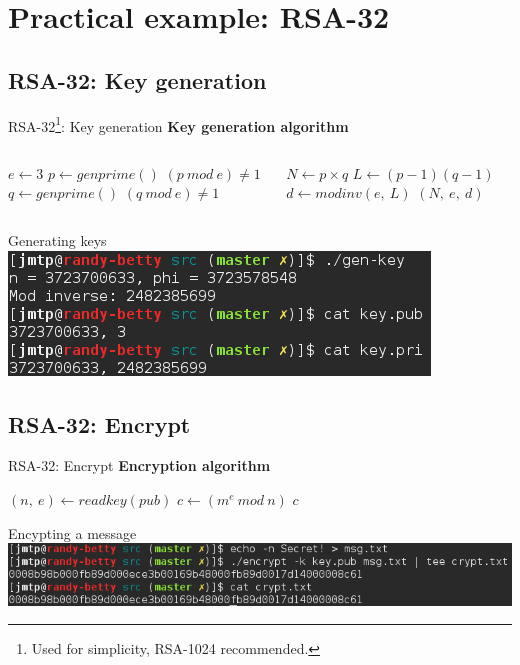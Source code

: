 \documentclass[pdf]{beamer}
\begin{document}
\section{Practical example: RSA-32}
\subsection{RSA-32: Key generation}
\begin{frame}{RSA-32\footnote{Used for simplicity, RSA-1024 recommended.}: Key generation}
	\textbf{Key generation algorithm}
	\begin{footnotesize}
	\begin{columns}[t]
	\begin{algorithmic}
		\State $e\gets 3$
		\Repeat
			\State $p\gets genprime()$
		\Until $(p\ mod\ e) \neq 1$
		\Repeat
			\State $q\gets genprime()$
		\Until $(q\ mod\ e) \neq 1$
	\end{algorithmic}
	\column{0.5\linewidth}
	\begin{algorithmic}
		\State $N\gets p\times q$
		\State $L\gets (p-1)(q-1)$
		\State $d\gets modinv(e,\ L)$
		\State \Return $(N,\ e,\ d)$
	\end{algorithmic}
	\end{columns}
	\end{footnotesize}
	\vspace{0.2cm}
	\begin{block}{Generating keys}
		\centering
		\includegraphics[scale=0.4]{img/gen-key.png}
	\end{block}
\end{frame}

\subsection{RSA-32: Encrypt}
\begin{frame}{RSA-32: Encrypt}
	\textbf{Encryption algorithm}
	\begin{algorithmic}
		\State $(n,\ e)\gets readkey(pub)$
		\State $c\gets (m^e\ mod\ n)$
		\State \Return $c$
	\end{algorithmic}
	\vspace{1cm}
	\begin{block}{Encypting a message}
		\centering
		\includegraphics[scale=0.4]{img/encrypt.png}
	\end{block}
\end{frame}
\end{document}
